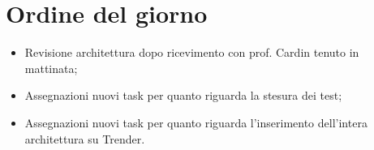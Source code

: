 \documentclass[../verbale-2017-02-28.tex]{subfiles}
\begin{document}
	
\section{Ordine del giorno}
	\begin{itemize}
		\item Revisione architettura dopo ricevimento con prof. Cardin tenuto in mattinata;
		\item Assegnazioni nuovi task per quanto riguarda la stesura dei test;
		\item Assegnazioni nuovi task per quanto riguarda l'inserimento dell'intera architettura su Trender.
	\end{itemize}
	
\end{document}

